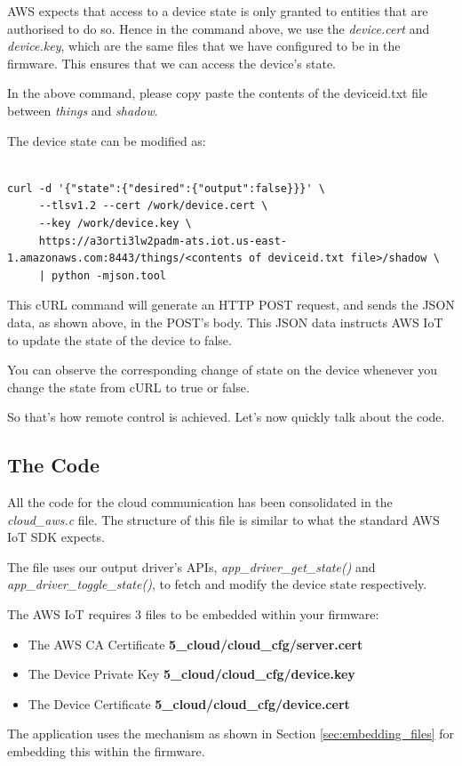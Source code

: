 \documentclass[main.tex]{subfiles}
\begin{document}
AWS expects that access to a device state is only granted to entities that are authorised to do so. Hence in the command above, we use the \textit{device.cert} and \textit{device.key}, which are the same files that we have configured to be in the firmware. This ensures that we can access the device's state.

In the above command, please copy paste the contents of the deviceid.txt file between \textit{things} and \textit{shadow}.

The device state can be modified as:
\begin{verbatim}

curl -d '{"state":{"desired":{"output":false}}}' \ 
     --tlsv1.2 --cert /work/device.cert \ 
     --key /work/device.key \ 
     https://a3orti3lw2padm-ats.iot.us-east-1.amazonaws.com:8443/things/<contents of deviceid.txt file>/shadow \
     | python -mjson.tool
\end{verbatim}

This cURL command will generate an HTTP POST request, and sends the JSON data, as shown above, in the POST's body. This JSON data instructs AWS IoT to update the state of the device to false.

You can observe the corresponding change of state on the device whenever you change the state from cURL to true or false.

So that's how remote control is achieved. Let's now quickly talk about the code.

\subsection{The Code}\index{The Code}
All the code for the cloud communication has been consolidated in the \textit{cloud_aws.c} file. The structure of this file is similar to what the standard AWS IoT SDK expects.

The file uses our output driver's APIs, \textit{app\_driver\_get\_state()} and \textit{app\_driver\_toggle\_state()}, to fetch and modify the device state respectively.

The AWS IoT requires 3 files to be embedded within your firmware:
\begin{itemize}
        \item The AWS CA Certificate  \textbf{5\_cloud/cloud_cfg/server.cert}
        \item The Device Private Key  \textbf{5\_cloud/cloud_cfg/device.key}
        \item The Device Certificate  \textbf{5\_cloud/cloud_cfg/device.cert}
\end{itemize}
The application uses the mechanism as shown in Section \ref{sec:embedding_files} for embedding this within the firmware.
\end{document}
